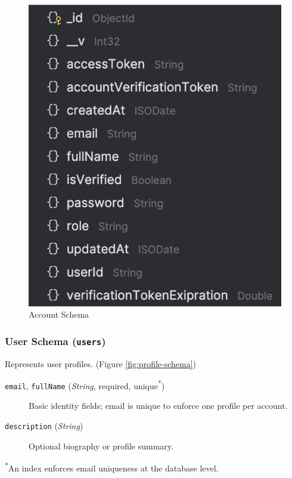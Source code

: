 \begin{figure}[H]
  \centering
  \includegraphics{account-schema.png}
  \caption{Account Schema}
  \label{fig:acc-schema}
\end{figure}

\subsubsection{User Schema (\texttt{users})}
Represents user profiles. (Figure \ref{fig:profile-schema})
\begin{description}
  \item[\texttt{email}, \texttt{fullName} (\emph{String}, required, unique\textsuperscript{*})]  
    Basic identity fields; email is unique to enforce one profile per account.
  \item[\texttt{description} (\emph{String})]  
    Optional biography or profile summary.
\end{description}
\textsuperscript{*}An index enforces email uniqueness at the database level.

